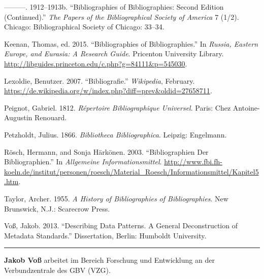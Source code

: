 \documentclass[a4paper,
fontsize=11pt,
oneside,
numbers=noperiodatend,
parskip=half-,
bibliography=totoc,
final
]{scrartcl}
\begin{document}
---------. 1912--1913b. ``Bibliographies of Bibliographies: Second
Edition (Continued).'' \emph{The Papers of the Bibliographical Society
of America} 7 (1/2). Chicago: Bibliographical Society of Chicago:
33--34.

Keenan, Thomas, ed. 2015. ``Bibliographies of Bibliographies.'' In
\emph{Russia, Eastern Europe, and Eurasia: A Research Guide}. Pricenton
University Library.
\url{http://libguides.princeton.edu/c.php?g=84111\&p=545030}.

Lexoldie, Benutzer. 2007. ``Bibliografie.'' \emph{Wikipedia}, February.
\url{https://de.wikipedia.org/w/index.php?diff=prev\&oldid=27658711}.

Peignot, Gabriel. 1812. \emph{Répertoire Bibliographique Universel}.
Paris: Chez Antoine-Augustin Renouard.

Petzholdt, Julius. 1866. \emph{Bibliotheca Bibliographica}. Leipzig:
Engelmann.

Rösch, Hermann, and Sonja Härkönen. 2003. ``Bibliographien Der
Bibliographien.'' In \emph{Allgemeine Informationsmittel}.
\url{http://www.fbi.fh-koeln.de/institut/personen/roesch/Material_Roesch/Informationsmittel/Kapitel5.htm}.

Taylor, Archer. 1955. \emph{A History of Bibliographies of
Bibliographies}. New Brunswick, N.J.: Scarecrow Press.

Voß, Jakob. 2013. ``Describing Data Patterns. A General Deconstruction
of Metadata Standards.'' Dissertation, Berlin: Humboldt University.

\begin{center}\rule{0.5\linewidth}{\linethickness}\end{center}

\textbf{Jakob Voß} arbeitet im Bereich Forschung und Entwicklung an der
Verbundzentrale des GBV (VZG).
\end{document}
